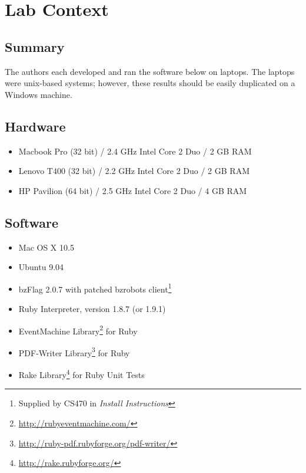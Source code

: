\chapter{Lab Context}\label{chap:context}
\section{Summary}
The authors each developed and ran the software below on laptops.  The laptops were unix-based systems; however, these results should be easily duplicated on a Windows machine.

\section{Hardware}
\begin{itemize}
    \item Macbook Pro (32 bit) / 2.4 GHz Intel Core 2 Duo / 2 GB RAM
    \item Lenovo T400 (32 bit) / 2.2 GHz Intel Core 2 Duo / 2 GB RAM
    \item HP Pavilion (64 bit) / 2.5 GHz Intel Core 2 Duo / 4 GB RAM
\end{itemize}

\section{Software}
\begin{itemize}
    \item Mac OS X 10.5
    \item Ubuntu 9.04
    \item bzFlag 2.0.7 with patched bzrobots client\footnote{Supplied by CS470 in \textsl{Install Instructions}}
    \item Ruby Interpreter, version 1.8.7 (or 1.9.1)
    \item EventMachine Library\footnote{\url{http://rubyeventmachine.com/}} for Ruby
    \item PDF-Writer Library\footnote{\url{http://ruby-pdf.rubyforge.org/pdf-writer/}} for Ruby
    \item Rake Library\footnote{\url{http://rake.rubyforge.org/}} for Ruby Unit Tests
\end{itemize}
